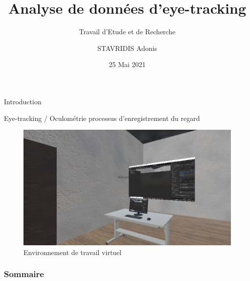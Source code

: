 \documentclass{beamer}
\title[Analyse de données d'eye-tracking]{Analyse de données d'eye-tracking}
\subtitle{Travail d'Etude et de Recherche}
\author[STAVRIDIS Adonis]{STAVRIDIS Adonis}
\institute[Unistra]{
  Université de Strasbourg \and 
  Antonio Capobianco \& Flavien Lécuyer
}
\date[TER]{25 Mai 2021}
\begin{document}

\frame{\titlepage}
\begin{frame}{Introduction}
  \begin{block}{Eye-tracking / Oculométrie}
    processus d'enregistrement du regard
  \end{block}
  \begin{figure}
    \includegraphics[height=0.35\textwidth]{environnement.png}
    \caption{Environnement de travail virtuel }
  \end{figure}
\end{frame}
\begin{frame}
  \frametitle{Sommaire}
  \tableofcontents
\end{frame}
\end{document}
